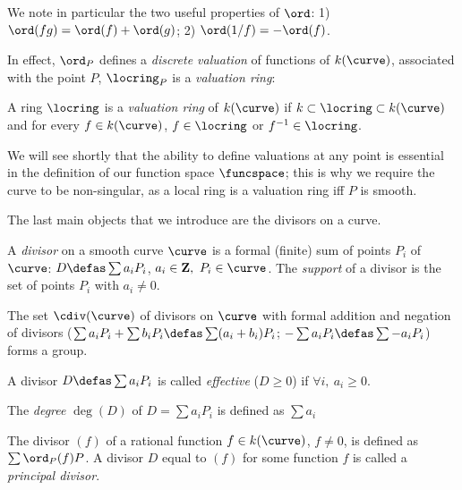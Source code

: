 We note in particular the two useful properties of $\ord$:
1) $\ord(fg) = \ord(f) + \ord(g)$; 2) $\ord(1/f) = -\ord(f)$.

In effect, $\ord_P$ defines a \emph{discrete valuation} of functions of $k(\curve)$, associated with the point $P$, \ie $\locring_P$ is a \emph{valuation ring}:

\begin{defi}
A ring $\locring$ is a \emph{valuation ring} of $k(\curve)$ if $k \subset \locring \subset k(\curve)$  and for every $f \in k(\curve)$,
$f \in \locring$ or $f^{-1} \in \locring$.
\end{defi}

We will see shortly that the ability to define valuations at any point is essential
in the definition of our function space $\funcspace$; this is why we require the curve to be non-singular, as a local ring is a valuation ring iff $P$ is smooth.

\medskip

The last main objects that we introduce are the divisors on a curve.

\begin{defi}[Divisor]
A \emph{divisor} on a smooth curve $\curve$ is a formal (finite) sum of points $P_i$ of $\curve$: $D \defas \sum a_iP_i$, $a_i \in \mathbf{Z},~P_i \in \curve$.
The \emph{support} of a divisor is the set of points $P_i$ with $a_i \neq 0$.

\noindent
The set $\cdiv(\curve)$ of divisors on $\curve$ with formal addition and negation of divisors ($\sum a_iP_i + \sum b_iP_i \defas \sum (a_i+b_i)P_i$;
$-\sum a_iP_i \defas \sum -a_iP_i$) forms a group.

\noindent
A divisor $D \defas \sum a_iP_i$ is called \emph{effective} ($D \geq 0$) if $\forall i,~a_i \geq 0$.

\noindent
The \emph{degree} $\deg(D)$ of $D = \sum a_iP_i$ is defined as $\sum a_i$
\end{defi}

\begin{defi}
The divisor $(f)$ of a rational function $f \in k(\curve)$, $f \neq 0$, is defined as $\sum \ord_P(f)P$.
A divisor $D$ equal to $(f)$ for some function $f$ is called a \emph{principal divisor}.
\end{defi}

